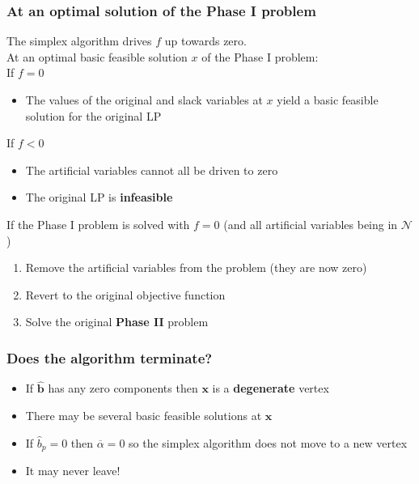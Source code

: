 \documentclass[11pt,a4paper]{article}
\begin{document}
\subsubsection*{At an optimal solution of the Phase I problem}

The simplex algorithm drives $f$ up towards zero.\\
At an optimal basic feasible solution $x$ of the Phase I problem:\\

If $f=0$
\begin{itemize}
    \item The values of the original and slack variables at $x$
        yield a basic feasible solution for the original LP
\end{itemize}

If $f<0$
\begin{itemize}
    \item The artificial variables cannot all be driven to zero
    \item The original LP is \textbf{infeasible}
\end{itemize}

If the Phase I problem is solved with $f=0$ (and all artificial variables being in $\mathcal{N}$)
\begin{enumerate}
    \item Remove the artificial variables from the problem (they are now zero)
    \item Revert to the original objective function
    \item Solve the original \textbf{Phase II} problem
\end{enumerate}

\subsubsection*{Does the algorithm terminate?}

\begin{itemize}
    \item If $\widehat{\textbf{b}}$ has any zero components then $\textbf{x}$ is a
        \textbf{degenerate} vertex
    \item There may be several basic feasible solutions at $\textbf{x}$
    \item If $\widehat{b}_p = 0$ then $\overline{\alpha} = 0$
        so the simplex algorithm does not move to a new vertex
    \item It may never leave!
\end{itemize}
\end{document}
